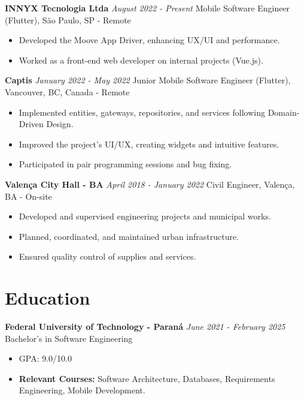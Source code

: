 \documentclass[10pt, letterpaper]{article}
\begin{document}
\textbf{INNYX Tecnologia Ltda} \hfill \textit{August 2022 - Present}\newline
Mobile Software Engineer (Flutter), São Paulo, SP - Remote
\begin{itemize}
    \item Developed the Moove App Driver, enhancing UX/UI and performance.
    \item Worked as a front-end web developer on internal projects (Vue.js).
\end{itemize}

\textbf{Captis} \hfill \textit{January 2022 - May 2022}\newline
Junior Mobile Software Engineer (Flutter), Vancouver, BC, Canada - Remote
\begin{itemize}
    \item Implemented entities, gateways, repositories, and services following Domain-Driven Design.
    \item Improved the project’s UI/UX, creating widgets and intuitive features.
    \item Participated in pair programming sessions and bug fixing.
\end{itemize}

\textbf{Valença City Hall - BA} \hfill \textit{April 2018 - January 2022}\newline
Civil Engineer, Valença, BA - On-site
\begin{itemize}
    \item Developed and supervised engineering projects and municipal works.
    \item Planned, coordinated, and maintained urban infrastructure.
    \item Ensured quality control of supplies and services.
\end{itemize}

\section{Education}
\textbf{Federal University of Technology - Paraná} \hfill \textit{June 2021 - February 2025}\newline
Bachelor's in Software Engineering
\begin{itemize}
    \item GPA: 9.0/10.0
    \item \textbf{Relevant Courses:} Software Architecture, Databases, Requirements Engineering, Mobile Development.
\end{itemize}
\end{document}
